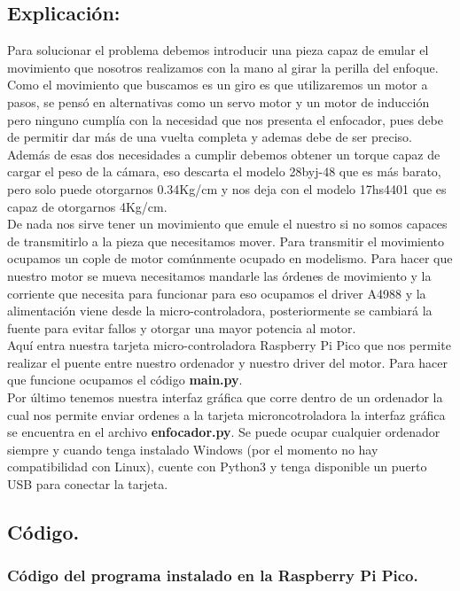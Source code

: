 \documentclass{article}
\begin{document}
        \subsection*{Explicación:}
            Para solucionar el problema debemos introducir una pieza capaz de emular el movimiento que nosotros realizamos con la mano al girar la perilla del enfoque. Como el movimiento que buscamos es un giro es que utilizaremos un motor a pasos, se pensó en alternativas como un servo motor y un motor de inducción pero ninguno cumplía con la necesidad que nos presenta el enfocador, pues debe de permitir dar más de una vuelta completa y ademas debe de ser preciso. Además de esas dos necesidades a cumplir debemos obtener un torque capaz de cargar el peso de la cámara, eso descarta el modelo 28byj-48 que es más barato, pero solo puede otorgarnos 0.34Kg/cm y nos deja con el modelo 17hs4401 que es capaz de otorgarnos 4Kg/cm.\\
            De nada nos sirve tener un movimiento que emule el nuestro si no somos capaces de transmitirlo a la pieza que necesitamos mover. Para transmitir el movimiento ocupamos un cople de motor comúnmente ocupado en modelismo.
            Para hacer que nuestro motor se mueva necesitamos mandarle las órdenes de movimiento y la corriente que necesita para funcionar para eso ocupamos el driver A4988 y la alimentación viene desde la micro-controladora, posteriormente se cambiará la fuente para evitar fallos y otorgar una mayor potencia al motor.\\
            Aquí entra nuestra tarjeta micro-controladora Raspberry Pi Pico que nos permite realizar el puente entre nuestro ordenador y nuestro driver del motor. Para hacer que funcione ocupamos el código \textbf{main.py}.\\
            Por último tenemos nuestra interfaz gráfica que corre dentro de un ordenador la cual nos permite enviar ordenes a la tarjeta microncotroladora la interfaz gráfica se encuentra en el archivo \textbf{enfocador.py}. Se puede ocupar cualquier ordenador siempre y cuando tenga instalado Windows (por el momento no hay compatibilidad con Linux), cuente con Python3 y tenga disponible un puerto USB para conectar la tarjeta.\\
        \subsection*{Código.}
            \subsubsection*{Código del programa instalado en la Raspberry Pi Pico.}
            
\end{document}
